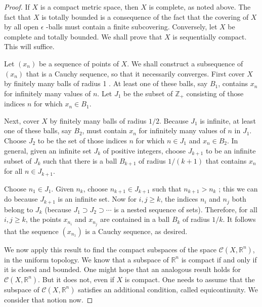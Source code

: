 \begin{proof}
If \(X\) is a compact metric space, then \(X\) is complete, as noted above. The fact that \(X\) is totally bounded is a consequence of the fact that the covering of \(X\) by all open \(\epsilon\) -balls must contain a finite subcovering.
Conversely, let \(X\) be complete and totally bounded. We shall prove that \(X\) is sequentially compact. This will suffice.

Let \((x_{n})\) be a sequence of points of \(X\). We shall construct a subsequence of \((x_{n})\) that is a Cauchy sequence, so that it necessarily converges. First cover \(X\) by finitely many balls of radius 1 . At least one of these balls, say \(B_{1}\), contains \(x_{n}\) for infinitely many values of \(n\). Let \(J_{1}\) be the subset of \(\mathbb{Z}_{ + }\) consisting of those indices \(n\) for which \(x_{n} \in {B}_{1}\).

Next, cover \(X\) by finitely many balls of radius \(1/2\). Because \(J_{1}\) is infinite, at least one of these balls, say \(B_{2}\), must contain \(x_{n}\) for infinitely many values of \(n\) in \(J_{1}\). Choose \(J_{2}\) to be the set of those indices \(n\) for which \(n \in {J}_{1}\) and \(x_{n} \in {B}_{2}\). In general, given an infinite set \(J_{k}\) of positive integers, choose \(J_{k + 1}\) to be an infinite subset of \(J_{k}\) such that there is a ball \(B_{k + 1}\) of radius \(1/({k + 1})\) that contains \(x_{n}\) for all \(n \in {J}_{k + 1}\).

Choose \(n_{1} \in {J}_{1}\). Given \(n_{k}\), choose \(n_{k + 1} \in {J}_{k + 1}\) such that \(n_{k + 1} > n_{k}\) ; this we can do because \(J_{k + 1}\) is an infinite set. Now for \(i,j \geq k\), the indices \(n_{i}\) and \(n_{j}\) both belong to \(J_{k}\) (because \(J_{1} \supset {J}_{2} \supset \cdots\) is a nested sequence of sets). Therefore, for all \(i,j \geq k\), the points \(x_{n_{i}}\) and \(x_{n_{j}}\) are contained in a ball \(B_{k}\) of radius \(1/k\). It follows that the sequence \((x_{n_{1}})\) is a Cauchy sequence, as desired.

We now apply this result to find the compact subspaces of the space \(\mathcal{C}({X,\mathbb{R}^{n}})\), in the uniform topology. We know that a subspace of \(\mathbb{R}^{n}\) is compact if and only if it is closed and bounded. One might hope that an analogous result holds for \(\mathcal{C}({X,\mathbb{R}^{n}})\). But it does not, even if \(X\) is compact. One needs to assume that the subspace of \(\mathcal{C}({X,\mathbb{R}^{n}})\) satisfies an additional condition, called equicontinuity. We consider that notion now.
\end{proof}
